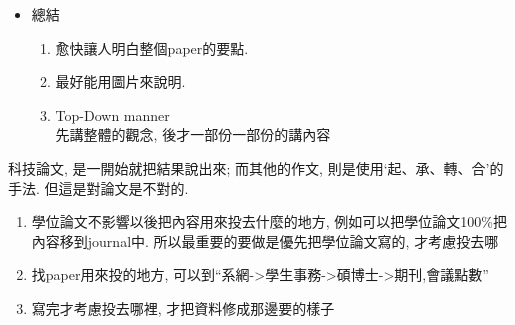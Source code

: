 \begin{enumerate}
{\begin{itemize}
      \item
      {
        總結
        \begin{enumerate}
          \item
          {
            愈快讓人明白整個paper的要點.
          } %

          \item
          {
            最好能用圖片來說明.
          } %

          \item
          {
            Top-Down manner\\
            先講整體的觀念, 後才一部份一部份的講內容
          } %
        \end{enumerate}
      } %
    \end{itemize}

    科技論文, 是一開始就把結果說出來; 而其他的作文, 則是使用`起、承、轉、合'的手法. 但這是對論文是不對的.
  } %
\end{enumerate}


\begin{enumerate}
  \item
  {
    學位論文不影響以後把內容用來投去什麼的地方, 例如可以把學位論文100\%把內容移到journal中. 所以最重要的要做是優先把學位論文寫的, 才考慮投去哪
  } %

  \item
  {
    找paper用來投的地方, 可以到``系網->學生事務->碩博士->期刊,會議點數''
  } %

  \item
  {
    寫完才考慮投去哪裡, 才把資料修成那邊要的樣子
  } %
\end{enumerate}


